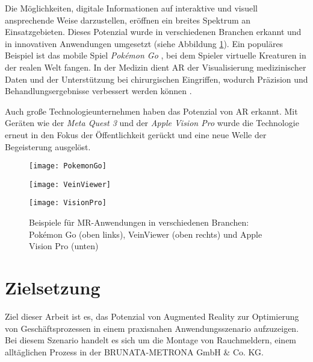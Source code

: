 Die Möglichkeiten, digitale Informationen auf interaktive und visuell ansprechende Weise darzustellen, eröffnen ein breites Spektrum an Einsatzgebieten. Dieses Potenzial wurde in verschiedenen Branchen erkannt und in innovativen Anwendungen umgesetzt (siehe Abbildung \ref{fig:MRApplications}). Ein populäres Beispiel ist das mobile Spiel \textit{Pokémon Go} \cite{wikipedia2024pokemonGo}, bei dem Spieler virtuelle Kreaturen in der realen Welt fangen. In der Medizin dient AR der Visualisierung medizinischer Daten und der Unterstützung bei chirurgischen Eingriffen, wodurch Präzision und Behandlungsergebnisse verbessert werden können \cite{chen2017medicalMR}.

Auch große Technologieunternehmen haben das Potenzial von AR erkannt. Mit Geräten wie der \textit{Meta Quest 3} \cite{meta2024quest} und der \textit{Apple Vision Pro} \cite{apple2023visionPro} wurde die Technologie erneut in den Fokus der Öffentlichkeit gerückt und eine neue Welle der Begeisterung ausgelöst.

\begin{figure}[h]
    \centering
    \begin{minipage}{0.45\textwidth}
        \centering
        \texttt{[image: PokemonGo]}
    \end{minipage}
    \begin{minipage}{0.45\textwidth}
        \centering
        \texttt{[image: VeinViewer]}
    \end{minipage}
    \begin{minipage}{0.45\textwidth}
        \centering
        \texttt{[image: VisionPro]}
    \end{minipage}
    \caption{Beispiele für MR-Anwendungen in verschiedenen Branchen: Pokémon Go (oben links), VeinViewer (oben rechts) und Apple Vision Pro (unten) \cite{wikipedia2024pokemonGo, chen2017medicalMR, apple2023visionPro}}
    \label{fig:MRApplications}
\end{figure}

\section{Zielsetzung}

Ziel dieser Arbeit ist es, das Potenzial von Augmented Reality zur Optimierung von Geschäftsprozessen in einem praxisnahen Anwendungsszenario aufzuzeigen. Bei diesem Szenario handelt es sich um die Montage von Rauchmeldern, einem alltäglichen Prozess in der BRUNATA-METRONA GmbH \& Co. KG.

